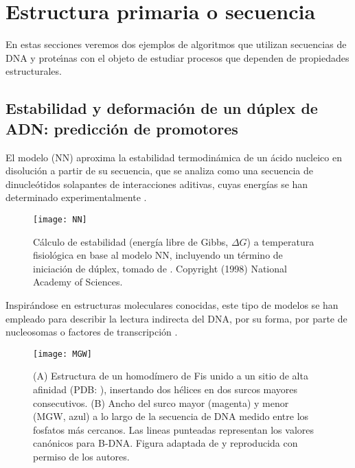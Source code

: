 \chapter{Estructura primaria o secuencia} \label{secuencia}

En estas secciones veremos dos ejemplos de algoritmos que utilizan secuencias de DNA y prote\'\i{}nas con el objeto de estudiar procesos que dependen de propiedades estructurales.


\section{Estabilidad y deformaci\'{o}n de un d\'{u}plex de ADN: predicci\'{o}n de promotores} \label{dna1}
 
 
El modelo  (NN) aproxima la estabilidad termodin\'{a}mica de un \'{a}cido nucleico en disoluci\'{o}n
a partir de su secuencia, que se analiza como una secuencia de dinucle\'{o}tidos solapantes 
de interacciones aditivas, cuyas energ\'{i}as se han determinado experimentalmente \citep{Breslauer1986,SantaLucia1998}.

\begin{figure}
\begin{center} 
\texttt{[image: NN]}
\caption
{
C\'{a}lculo de estabilidad (energ\'{i}a libre de Gibbs, $\Delta G$) a temperatura fisiol\'{o}gica en base al modelo NN, 
incluyendo un t\'{e}rmino de iniciaci\'{o}n de d\'{u}plex, tomado de \citep{SantaLucia1998}.
Copyright (1998) National Academy of Sciences.
}
\label{fig:NN}
\end{center}
\end{figure}

Inspir\'{a}ndose en estructuras moleculares conocidas, 
este tipo de modelos se han empleado para describir la lectura indirecta del DNA, por su forma, 
por parte de nucleosomas \citep{Heijden2012} o factores de transcripci\'{o}n \citep{Gromiha2004,Espinosa2008}.

\begin{figure}
\begin{center} 
\texttt{[image: MGW]}
\caption
{
(A) Estructura de un homod\'{i}mero de Fis unido a un sitio de alta afinidad 
(PDB: ), 
insertando dos h\'{e}lices en dos surcos mayores consecutivos. 
(B) Ancho del surco mayor (magenta) y menor (MGW, azul) a lo largo de la secuencia de DNA medido entre los fosfatos m\'{a}s cercanos.
Las lineas punteadas representan los valores can\'{o}nicos para B-DNA. 
Figura adaptada de \citet{Hancock2013} y reproducida con permiso de los autores.
}
\label{fig:MGW}
\end{center}
\end{figure}

